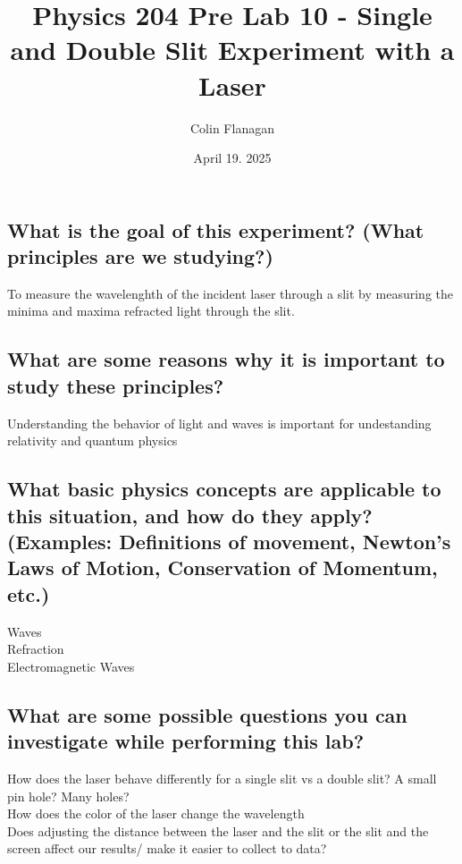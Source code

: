 \documentclass{article}
\title{Physics 204 Pre Lab 10 - Single and Double Slit Experiment with a Laser}
\author{Colin Flanagan}
\date{April 19. 2025}
\begin{document}
\maketitle

\subsection*{What is the goal of this experiment? (What principles are we studying?)}

    To measure the wavelenghth of the incident laser through a slit by measuring the minima and maxima refracted light through the slit.

\subsection*{What are some reasons why it is important to study these principles?
}

  Understanding the behavior of light and waves is important for undestanding relativity and quantum physics
    
\subsection*{What basic physics concepts are applicable to this situation, and how do they apply? (Examples: Definitions of movement, Newton’s Laws of Motion, Conservation of Momentum, etc.)}

    Waves\\

    Refraction\\

    Electromagnetic Waves\\

\subsection*{What are some possible questions you can investigate while performing this lab?
}

   How does the laser behave differently for a single slit vs a double slit? A small pin hole? Many holes?\\

   How does the color of the laser change the wavelength\\

   Does adjusting the distance between the laser and the slit or the slit and the screen affect our results/ make it easier to collect to data?
\end{document}
